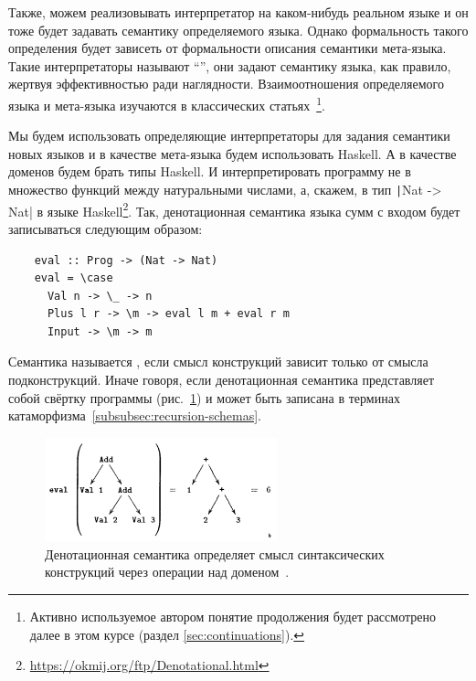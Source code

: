 Также, можем реализовывать интерпретатор на каком-нибудь реальном языке и он тоже будет задавать семантику определяемого языка.
Однако формальность такого определения будет зависеть от формальности описания семантики мета-языка.
Такие интерпретаторы называют ``'', они задают семантику языка, как правило, жертвуя эффективностью ради наглядности.
Взаимоотношения определяемого языка и мета-языка изучаются в классических статьях~\cite{reynolds1972definitional,reynolds1998definitional}\footnote{Активно используемое автором понятие продолжения будет рассмотрено далее в этом курсе (раздел \ref{sec:continuations}).}.

Мы будем использовать определяющие интерпретаторы для задания семантики новых языков и в качестве мета-языка будем использовать Haskell.
А в качестве доменов будем брать типы Haskell.
И интерпретировать программу не в множество функций между натуральными числами, а, скажем, в тип \texttt|Nat -> Nat| в языке Haskell\footnote{\url{https://okmij.org/ftp/Denotational.html}}. %
Так, денотационная семантика языка сумм с входом будет записываться следующим образом:
\begin{verbatim}
    eval :: Prog -> (Nat -> Nat)
    eval = \case
      Val n -> \_ -> n
      Plus l r -> \m -> eval l m + eval r m
      Input -> \m -> m
\end{verbatim}

Семантика называется , если смысл конструкций зависит только от смысла подконструкций.
Иначе говоря, если денотационная семантика представляет собой свёртку программы (рис.\ \ref{fig:eval-prog}) и может быть записана в терминах катаморфизма~\ref{subsubsec:recursion-schemas}.

\begin{figure}[h]
    \centering
    \includegraphics[width=0.6\textwidth]{figs/eval-prog}
    \caption{Денотационная семантика определяет смысл синтаксических конструкций через операции над доменом~\cite{hutton1998fold}.}
    \label{fig:eval-prog}
\end{figure}

